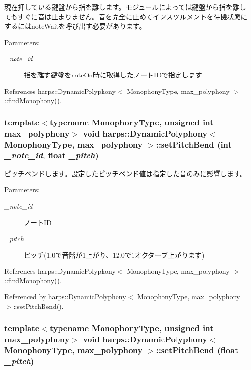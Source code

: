 現在押している鍵盤から指を離します。モジュールによっては鍵盤から指を離してもすぐに音は止まりません。音を完全に止めてインスツルメントを待機状態にするにはnoteWaitを呼び出す必要があります。 \begin{Desc}
\item[Parameters:]
\begin{description}
\item[{\em \_\-note\_\-id}]指を離す鍵盤をnoteOn時に取得したノートIDで指定します \end{description}
\end{Desc}


References harps::DynamicPolyphony$<$ MonophonyType, max\_\-polyphony $>$::findMonophony().
\subsubsection[setPitchBend]{\setlength{\rightskip}{0pt plus 5cm}template$<$typename MonophonyType, unsigned int max\_\-polyphony$>$ void {\bf harps::DynamicPolyphony}$<$ MonophonyType, max\_\-polyphony $>$::setPitchBend (int {\em \_\-note\_\-id}, \/  float {\em \_\-pitch})\hspace{0.3cm}{\tt  [inline]}}\label{classharps_1_1DynamicPolyphony_d150e720cad12009a12982f0b467a707}


ピッチベンドします。設定したピッチベンド値は指定した音のみに影響します。 \begin{Desc}
\item[Parameters:]
\begin{description}
\item[{\em \_\-note\_\-id}]ノートID \item[{\em \_\-pitch}]ピッチ(1.0で音階が1上がり、12.0で1オクターブ上がります) \end{description}
\end{Desc}


References harps::DynamicPolyphony$<$ MonophonyType, max\_\-polyphony $>$::findMonophony().

Referenced by harps::DynamicPolyphony$<$ MonophonyType, max\_\-polyphony $>$::setPitchBend().
\subsubsection[setPitchBend]{\setlength{\rightskip}{0pt plus 5cm}template$<$typename MonophonyType, unsigned int max\_\-polyphony$>$ void {\bf harps::DynamicPolyphony}$<$ MonophonyType, max\_\-polyphony $>$::setPitchBend (float {\em \_\-pitch})\hspace{0.3cm}{\tt  [inline]}}\label{classharps_1_1DynamicPolyphony_c6e407d71432eec1425e56a5e5461f86}


